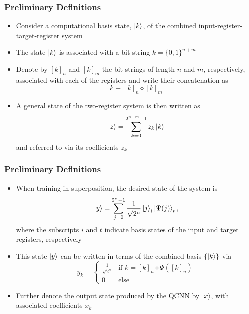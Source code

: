 \documentclass{beamer}
\begin{document}
\begin{frame}
\frametitle{Preliminary Definitions}
\begin{itemize}
\item Consider a computational basis state, $\ket{k}$, of the \alert{combined} input-register-target-register \alert{system} 
\item The state $\ket{k}$ is associated with a \alert{bit string} $k = \{0,1 \}^{n+m}$
\item Denote by $[k]_n$ and $[k]_m$ the bit strings of length $n$ and $m$, respectively, associated with each of the registers and write their \alert{concatenation} as 
\begin{equation}
k \equiv [k]_n \diamond [k]_m
\end{equation} 
\item A general state of the two-register system is then written as 
\begin{equation}
\ket{z} = \sum^{2^{n+m}-1}_{k=0} z_k \ket{k}
\end{equation}
and referred to via its \alert{coefficients} $z_k$
\end{itemize}
\end{frame}

\begin{frame}
\frametitle{Preliminary Definitions}
\begin{itemize}
\item When training in superposition, the \alert{desired state} of the system is 
\begin{equation}
\ket{y} = \sum_{j=0}^{2^n-1} \frac{1}{\sqrt{2^n}} \ket{j}_i \ket{\Psi(j)}_t,
\end{equation}
where the subscripts $i$ and $t$ indicate basis states of the input and target registers, respectively
\item This state $\ket{y}$ can be written in terms of the \alert{combined basis} $\{ \ket{k} \}$ via 
\begin{equation}
y_k = \begin{cases}
\frac{1}{\sqrt{2^n}}  & \text{if } k=[k]_n \diamond \Psi([k]_n) \\
0 & \text{else} 
\end{cases}
\end{equation}
\item Further denote the \alert{output state} produced by the QCNN by $\ket{x}$, with associated coefficients $x_k$
\end{itemize}
\end{frame}
\end{document}
